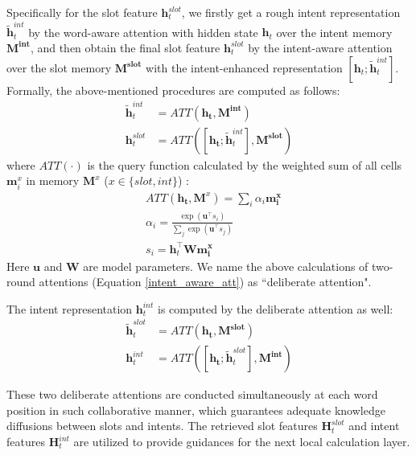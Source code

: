 \documentclass[11pt,a4paper]{article}
\begin{document}
Specifically for the slot feature $\mathbf{h}_t^{slot}$, we firstly get a rough intent representation $\widetilde{\mathbf{h}}_t^{int}$ by the word-aware attention with hidden state $\mathbf{h}_t$ over the intent memory $\mathbf{M^{int}}$, and then obtain the final slot feature $\mathbf{h}_t^{slot}$ by the intent-aware attention over the slot memory $\mathbf{M^{slot}}$ with the intent-enhanced representation $[\mathbf{h}_t;\widetilde{\mathbf{h}}_t^{int}]$.
Formally, the above-mentioned procedures are computed as follows:
\begin{equation}
    \begin{split}
    \widetilde{\mathbf{h}}_t^{int} &= ATT(\mathbf{h_t}, \mathbf{M^{int}}) \\
    \mathbf{h}_t^{slot} &= ATT([\mathbf{h_t};\widetilde{\mathbf{h}}_t^{int}], \mathbf{M^{slot}}) 
    \end{split}
    \label{intent_aware_att}
\end{equation}
where $ATT(\cdot)$ is the query function calculated by the weighted sum of all cells $\mathbf{m}_i^{x}$ in memory $\mathbf{M}^{x}$ ($x \in \{slot, int\}$)  :
\begin{equation}
    \begin{split}
    & ATT(\mathbf{h_t}, \mathbf{M}^{x}) = \sum\limits_{i}{\alpha_i \mathbf{m_i^{x}}} \\
    & \alpha_i = \frac{\exp ( \mathbf{u}^{\top}s_i )}
    {\sum_{j}{\exp ( \mathbf{u}^{\top}s_j) } } \\
    & s_i = \mathbf{h}_t^{\top} \mathbf{W} \mathbf{m_i^{x}}
    \end{split}
\end{equation}
Here $\mathbf{u}$ and $\mathbf{W}$ are model parameters. We name the above calculations of two-round attentions (Equation \ref{intent_aware_att}) as ``deliberate attention".

The intent representation $\mathbf{h}_t^{int}$ is computed by the deliberate attention as well:
\begin{equation}
    \begin{split}
    \widetilde{\mathbf{h}}_t^{slot} & = ATT(\mathbf{h_t}, \mathbf{M^{slot}}) \\
    \mathbf{h}_t^{int} &=  ATT([\mathbf{h_t};\widetilde{\mathbf{h}}_t^{slot}], \mathbf{M^{int}})
    \end{split}
\end{equation}

These two deliberate attentions are conducted simultaneously at each word position in such collaborative manner, which guarantees adequate knowledge diffusions between slots and intents. The retrieved slot features $\mathbf{H}_t^{slot}$ and intent features $\mathbf{H}_t^{int}$ are utilized to provide guidances for the next local calculation layer. 
\end{document}
